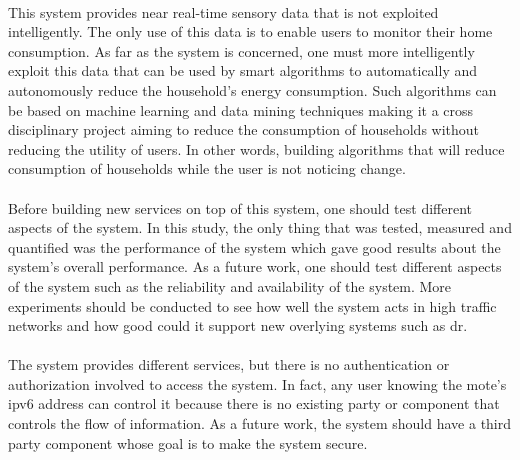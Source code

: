 \documentclass[oneside,12pt,a4paper,final]{book}
\begin{document}
\paragraph{}
This system provides near real-time sensory data that is not exploited intelligently. The only use of this data is to enable users to monitor their home consumption. As far as the system is concerned, one must more intelligently exploit this data that can be used by smart algorithms to automatically and autonomously reduce the household's energy consumption. Such algorithms can be based on machine learning and data mining techniques making it a cross disciplinary project aiming to reduce the consumption of households without reducing the utility of users. In other words, building algorithms that will reduce consumption of households while the user is not noticing change.
\paragraph{}
Before building new services on top of this system, one should test different aspects of the system. In this study, the only thing that was tested, measured and quantified was the performance of the system which gave good results about the system's overall performance. As a future work, one should test different aspects of the system such as the reliability and availability of the system. More experiments should be conducted to see how well the system acts in high traffic networks and how good could it support new overlying systems such as \gls{dr}.
\paragraph{}
The system provides different services, but there is no authentication or authorization involved to access the system. In fact, any user knowing the mote's \gls{ipv6} address can control it because there is no existing party or component that controls the flow of information. As a future work, the system should have a third party component whose goal is to make the system secure.

\renewcommand{\bibname}{Index}
 

\end{document}
